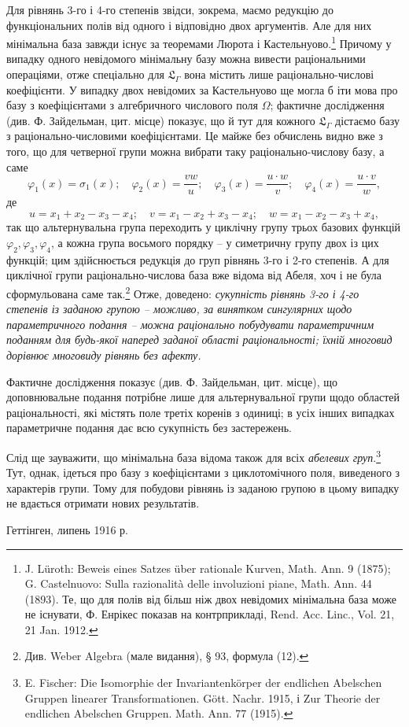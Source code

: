\documentclass[11pt]{article}
\begin{document}
Для рівнянь 3-го і 4-го степенів звідси, зокрема, маємо редукцію до функціональних полів від одного і відповідно двох аргументів. Але для них мінімальна база завжди існує за теоремами Люрота і Кастельнуово.\footnote{J. Lüroth: Beweis eines Satzes über rationale Kurven, Math. Ann. 9 (1875); G. Castelnuovo: Sulla razionalità delle involuzioni piane, Math. Ann. 44 (1893). Те, що для полів від більш ніж двох невідомих мінімальна база може не існувати, Ф. Енрікес показав на контрприкладі, Rend. Acc. Linc., Vol. 21, 21 Jan. 1912.} Причому у випадку одного невідомого мінімальну базу можна вивести раціональними операціями, отже спеціально для $\mathfrak L_\Gamma$ вона містить лише раціонально-числові коефіцієнти. У випадку двох невідомих за Кастельнуово ще могла б іти мова про базу з коефіцієнтами з алгебричного числового поля $\Omega$; фактичне дослідження (див. Ф. Зайдельман, цит. місце) показує, що й тут для кожного $\mathfrak L_\Gamma$ дістаємо базу з раціонально-числовими коефіцієнтами. Це майже без обчислень видно вже з того, що для четверної групи можна вибрати таку раціонально-числову базу, а саме
\[
\varphi_1(x)=\sigma_1(x);\quad \varphi_2(x)=\frac{v w}{u};\quad \varphi_3(x)=\frac{u\cdot w}{v};\quad \varphi_4(x)=\frac{u\cdot v}{w},
\]
де
\[
u=x_1+x_2-x_3-x_4;\quad v=x_1-x_2+x_3-x_4;\quad w=x_1-x_2-x_3+x_4,
\]
так що альтернувальна група переходить у циклічну групу трьох базових функцій $\varphi_2,\varphi_3,\varphi_4$, а кожна група восьмого порядку -- у симетричну групу двох із цих функцій; цим здійснюється редукція до груп рівнянь 3-го і 2-го степенів. А для циклічної групи раціонально-числова база вже відома від Абеля, хоч і не була сформульована саме так.\footnote{Див. Weber Algebra (мале видання), § 93, формула (12).} Отже, доведено: \emph{сукупність рівнянь 3-го і 4-го степенів із заданою групою -- можливо, за винятком сингулярних щодо параметричного подання -- можна раціонально побудувати параметричним поданням для будь-якої наперед заданої області раціональності; їхній многовид дорівнює многовиду рівнянь без афекту.}

Фактичне дослідження показує (див. Ф. Зайдельман, цит. місце), що доповнювальне подання потрібне лише для альтернувальної групи щодо областей раціональності, які містять поле третіх коренів з одиниці; в усіх інших випадках параметричне подання дає всю сукупність без застережень.

Слід ще зауважити, що мінімальна база відома також для всіх \emph{абелевих груп}.\footnote{E. Fischer: Die Isomorphie der Invariantenkörper der endlichen Abelschen Gruppen linearer Transformationen. Gött. Nachr. 1915, і Zur Theorie der endlichen Abelschen Gruppen. Math. Ann. 77 (1915).} Тут, однак, ідеться про базу з коефіцієнтами з циклотомічного поля, виведеного з характерів групи. Тому для побудови рівнянь із заданою групою в цьому випадку не вдається отримати нових результатів.

Геттінген, липень 1916 р.

\clearpage
\end{document}
